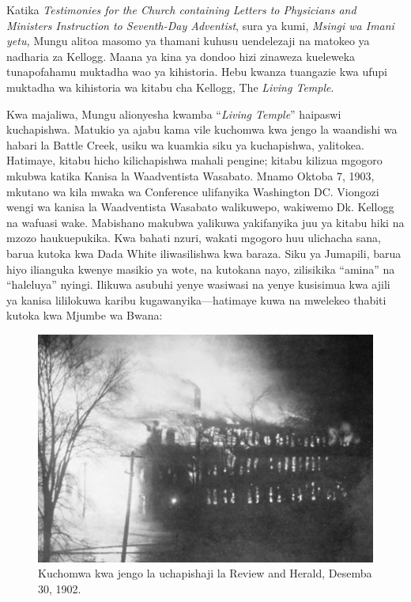 
Katika \textit{Testimonies for the Church containing Letters to Physicians and Ministers Instruction to Seventh-Day Adventist}, sura ya kumi, \textit{Msingi wa Imani yetu,} Mungu alitoa masomo ya thamani kuhusu uendelezaji na matokeo ya nadharia za Kellogg. Maana ya kina ya dondoo hizi zinaweza kueleweka tunapofahamu muktadha wao ya kihistoria. Hebu kwanza tuangazie kwa ufupi muktadha wa kihistoria wa kitabu cha Kellogg, The \textit{Living Temple}.

Kwa majaliwa, Mungu alionyesha kwamba “\textit{Living Temple}” haipaswi kuchapishwa. Matukio ya ajabu kama vile kuchomwa kwa jengo la waandishi wa habari la Battle Creek, usiku wa kuamkia siku ya kuchapishwa, yalitokea. Hatimaye, kitabu hicho kilichapishwa mahali pengine; kitabu kilizua mgogoro mkubwa katika Kanisa la Waadventista Wasabato. Mnamo Oktoba 7, 1903, mkutano wa kila mwaka wa Conference ulifanyika Washington DC. Viongozi wengi wa kanisa la Waadventista Wasabato walikuwepo, wakiwemo Dk. Kellogg na wafuasi wake. Mabishano makubwa yalikuwa yakifanyika juu ya kitabu hiki na mzozo haukuepukika. Kwa bahati nzuri, wakati mgogoro huu ulichacha sana, barua kutoka kwa Dada White iliwasilishwa kwa baraza. Siku ya Jumapili, barua hiyo ilianguka kwenye masikio ya wote, na kutokana nayo, zilisikika “amina” na “haleluya” nyingi. Ilikuwa asubuhi yenye wasiwasi na yenye kusisimua kwa ajili ya kanisa lililokuwa karibu kugawanyika—hatimaye kuwa na mwelekeo thabiti kutoka kwa Mjumbe wa Bwana:

\begin{figure}[h]
    \centering
    \includegraphics[width=1\linewidth]{images/review-and-herlad.jpg}
    \caption*{Kuchomwa kwa jengo la uchapishaji la Review and Herald, Desemba 30, 1902.}
    \label{fig:review-and-herald}
\end{figure}


